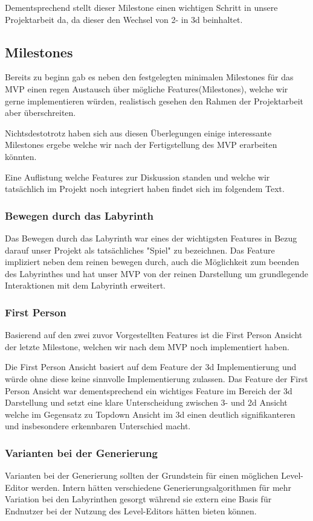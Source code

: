     	Dementsprechend stellt dieser Milestone einen wichtigen Schritt in unsere Projektarbeit da, da dieser den Wechsel von 2- in 3d beinhaltet.


\subsection{Milestones}\label{subsec:milestones}
    Bereits zu beginn gab es neben den festgelegten minimalen Milestones für das MVP einen regen Austausch über mögliche Features(Milestones), welche wir gerne implementieren würden, realistisch gesehen den Rahmen der Projektarbeit aber überschreiten.
    
    Nichtsdestotrotz haben sich aus diesen Überlegungen einige interessante Milestones ergebe welche wir nach der Fertigstellung des MVP erarbeiten könnten.
    
    Eine Auflistung welche Features zur Diskussion standen und welche wir tatsächlich im Projekt noch integriert haben findet sich im folgendem Text.


    \subsubsection*{Bewegen durch das Labyrinth}
        Das Bewegen durch das Labyrinth war eines der wichtigsten Features in Bezug darauf unser Projekt als tatsächliches "Spiel" zu bezeichnen. Das Feature impliziert neben dem reinen bewegen durch, auch die Möglichkeit zum beenden des Labyrinthes und hat unser MVP von der reinen Darstellung um grundlegende Interaktionen mit dem Labyrinth erweitert.

    \subsubsection*{First Person}
        Basierend auf den zwei zuvor Vorgestellten Features ist die First Person Ansicht der letzte Milestone, welchen wir nach dem MVP noch implementiert haben. 
        
        Die First Person Ansicht basiert auf dem Feature der 3d Implementierung und würde ohne diese keine sinnvolle Implementierung zulassen. Das Feature der First Person Ansicht war dementsprechend ein wichtiges Feature im Bereich der 3d Darstellung und setzt eine klare Unterscheidung zwischen 3- und 2d Ansicht welche im Gegensatz zu Topdown Ansicht im 3d einen deutlich signifikanteren und insbesondere erkennbaren Unterschied macht.    

    \subsubsection*{Varianten bei der Generierung}
        Varianten bei der Generierung sollten der Grundstein für einen möglichen Level-Editor werden. Intern hätten verschiedene Generierungsalgorithmen für mehr Variation bei den Labyrinthen gesorgt während sie extern eine Basis für Endnutzer bei der Nutzung des Level-Editors hätten bieten können.
        
